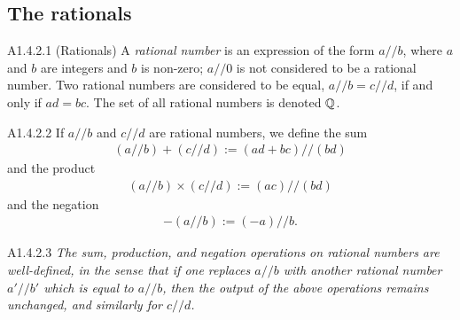 
\subsection{The rationals}
\begin{definition}{A1.4.2.1}
    (Rationals) A \emph{rational number} is an expression of the form $a // b$, where $a$ and $b$ are integers
    and $b$ is non-zero; $a // 0$ is not considered to be a rational number.
    Two rational numbers are considered to be equal, $a // b=c // d$, if and only if
    $ad=bc$. The set of all rational numbers is denoted $\mathbb{Q}$.
\end{definition}

\begin{definition}{A1.4.2.2}
    If $a // b$ and $c // d$ are rational numbers, we define the sum
    \begin{align*}
        (a // b) + (c // d) := (ad+bc) // (bd)
    \end{align*}
    and the product
    \begin{align*}
        (a // b) \times (c // d) := (ac) // (bd)
    \end{align*}
    and the negation
    \begin{align*}
        -(a // b) := (-a) // b.
    \end{align*}
\end{definition}

\begin{lemma}{A1.4.2.3}
    \emph{The sum, production, and negation operations on rational numbers are well-defined, in the sense that if one
    replaces $a // b$ with another rational number $a' // b'$ which is equal to $a // b$, then the output of the above
    operations remains unchanged, and similarly for $c // d$.}
\end{lemma}

